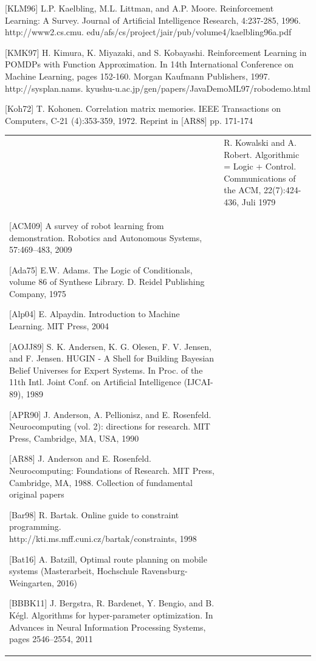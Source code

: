 \documentclass[10pt]{book}
\begin{document}
\begin{center}
[KLM96] L.P. Kaelbling, M.L. Littman, and A.P. Moore. Reinforcement Learning: A Survey. Journal of Artificial Intelligence Research, 4:237-285, 1996. http://www2.cs.cmu. edu/afs/cs/project/jair/pub/volume4/kaelbling96a.pdf

[KMK97] H. Kimura, K. Miyazaki, and S. Kobayashi. Reinforcement Learning in POMDPs with Function Approximation. In 14th International Conference on Machine Learning, pages 152-160. Morgan Kaufmann Publishers, 1997. http://sysplan.nams. kyushu-u.ac.jp/gen/papers/JavaDemoML97/robodemo.html

[Koh72] T. Kohonen. Correlation matrix memories. IEEE Transactions on Computers, C-21 (4):353-359, 1972. Reprint in [AR88] pp. 171-174

\begin{tabular}{|l|l|}
\hline [\cite{kr79}] & R. Kowalski and A. Robert. Algorithmic = Logic + Control. Communications of the ACM, 22(7):424-436, Juli 1979 \\
[ACM09] A survey of robot learning from demonstration. Robotics and Autonomous Systems, 57:469–483, 2009

[Ada75] E.W. Adams. The Logic of Conditionals, volume 86 of Synthese Library. D. Reidel Publishing Company, 1975

[Alp04] E. Alpaydin. Introduction to Machine Learning. MIT Press, 2004

[AOJJ89] S. K. Andersen, K. G. Olesen, F. V. Jensen, and F. Jensen. HUGIN - A Shell for Building Bayesian Belief Universes for Expert Systems. In Proc. of the 11th Intl. Joint Conf. on Artificial Intelligence (IJCAI-89), 1989

[APR90] J. Anderson, A. Pellionisz, and E. Rosenfeld. Neurocomputing (vol. 2): directions for research. MIT Press, Cambridge, MA, USA, 1990

[AR88] J. Anderson and E. Rosenfeld. Neurocomputing: Foundations of Research. MIT Press, Cambridge, MA, 1988. Collection of fundamental original papers

[Bar98] R. Bartak. Online guide to constraint programming. http://kti.ms.mff.cuni.cz/bartak/constraints, 1998

[Bat16] A. Batzill, Optimal route planning on mobile systems (Masterarbeit, Hochschule Ravensburg-Weingarten, 2016)

[BBBK11] J. Bergstra, R. Bardenet, Y. Bengio, and B. Kégl. Algorithms for hyper-parameter optimization. In Advances in Neural Information Processing Systems, pages 2546–2554, 2011


\end{tabular}
\end{center}
\end{document}
